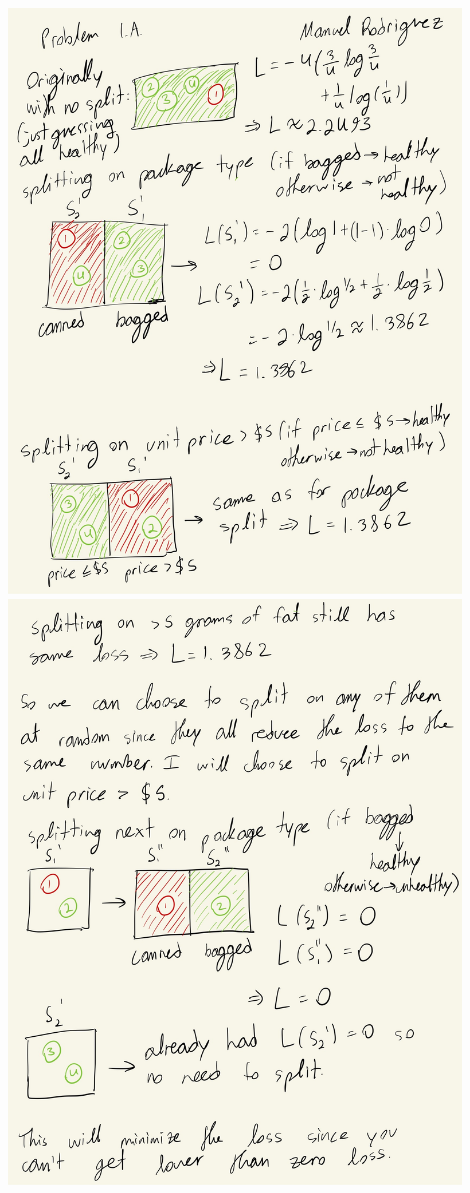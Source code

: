 \begin{solution}
    \\
    \includegraphics[width=12cm]{images/P1_A_1.JPG} \\
    \includegraphics[width=12cm]{images/P1_A_2.JPG} \\

\end{solution}
